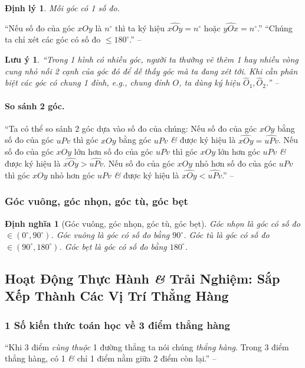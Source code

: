 \documentclass{article}
\numberwithin{equation}{section}
\newtheorem{definition}{Định nghĩa}[section]
\newtheorem{theorem}{Định lý}[section]
\newtheorem{remark}{Lưu ý}[section]
\begin{document}
\begin{theorem}
	Mỗi góc có 1 số đo.
\end{theorem}
``Nếu số đo của góc $xOy$ là $n^\circ$ thì ta ký hiệu $\widehat{xOy} = n^\circ$ hoặc $\widehat{yOx} = n^\circ$.'' ``Chúng ta chỉ xét các góc có số đo $\le 180^\circ$.'' -- \cite[p. 96]{Thai_Anh_Dat_Ha_Loan_Nam_Quang_Toan_6_tap_2}

\begin{remark}
	``Trong 1 hình có nhiều góc, người ta thường vẽ thêm 1 hay nhiều vòng cung nhỏ nối 2 cạnh của góc đó để dễ thấy góc mà ta đang xét tới. Khi cần phân biệt các góc có chung 1 đỉnh, e.g., chung đỉnh $O$, ta dùng ký hiệu $\widehat{O}_1,\widehat{O}_2$.'' -- \cite[p. 98]{Thai_Anh_Dat_Ha_Loan_Nam_Quang_Toan_6_tap_2}
\end{remark}

\paragraph{So sánh 2 góc.} ``Ta có thể so sánh 2 góc dựa vào số đo của chúng: Nếu số đo của góc $xOy$ bằng số đo của góc $uPv$ thì góc $xOy$ bằng góc $uPv$ \textit{\&} được ký hiệu là $\widehat{xOy} = \widehat{uPv}$. Nếu số đo của góc $xOy$ lớn hơn số đo của góc $uPv$ thì góc $xOy$ lớn hơn góc $uPv$ \textit{\&} được ký hiệu là $\widehat{xOy} > \widehat{uPv}$. Nếu số đo của góc $xOy$ nhỏ hơn số đo của góc $uPv$ thì góc $xOy$ nhỏ hơn góc $uPv$ \textit{\&} được ký hiệu là $\widehat{xOy} < \widehat{uPv}$.'' -- \cite[p. 98]{Thai_Anh_Dat_Ha_Loan_Nam_Quang_Toan_6_tap_2}

\subsubsection{Góc vuông, góc nhọn, góc tù, góc bẹt}

\begin{definition}[Góc vuông, góc nhọn, góc tù, góc bẹt]
	\emph{Góc nhọn} là góc có số đo $\in(0^\circ,90^\circ)$. \emph{Góc vuông} là góc có số đo bằng $90^\circ$. \emph{Góc tù} là góc có số đo $\in(90^\circ,180^\circ)$. \emph{Góc bẹt} là góc có số đo bằng $180^\circ$.
\end{definition}

\subsection{Hoạt Động Thực Hành \textit{\&} Trải Nghiệm: Sắp Xếp Thành Các Vị Trí Thẳng Hàng}

\subsubsection{1 Số kiến thức toán học về 3 điểm thẳng hàng}
``Khi 3 điểm \textit{cùng thuộc} 1 đường thẳng ta nói chúng \textit{thẳng hàng}. Trong 3 điểm thẳng hàng, có 1 \textit{\&} chỉ 1 điểm nằm giữa 2 điểm còn lại.'' -- \cite[p. 104]{Thai_Anh_Dat_Ha_Loan_Nam_Quang_Toan_6_tap_2}
\end{document}
